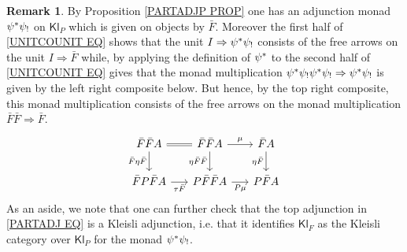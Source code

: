 \documentclass[a4paper,10pt
,draft
]{article}%
\numberwithin{equation}{section}
\numberwithin{figure}{section}
\theoremstyle{definition} %
\newtheorem{remark}[equation]{Remark}%
\newcommand{\Kl}{\mathsf{Kl}}
\newcommand{\1}{\ensuremath{\mathbbm 1}}%
\begin{document}
\begin{remark}\label{MONALGP REM}
By Proposition \ref{PARTADJP PROP}
one has an adjunction monad $\psi^{\**} \psi_!$
on $\Kl_P$ which is given on objects by $\bar{F}$.
Moreover the first half of
\eqref{UNITCOUNIT EQ} shows that the unit
$I \Rightarrow \psi^{\**} \psi_!$
consists of the free arrows on the unit $I \Rightarrow \bar{F}$
while, 
by applying the definition of $\psi^{\**}$ to the second half of
\eqref{UNITCOUNIT EQ}
gives that the monad multiplication
$\psi^{\**} \psi_!\psi^{\**} \psi_! \Rightarrow \psi^{\**} \psi_!$
is given by the left right composite below.
But hence, by the top right composite, 
this monad multiplication consists of the free arrows on
the monad multiplication $\bar{F} \bar{F} \Rightarrow \bar{F}$. 
\begin{equation}
\begin{tikzcd}[column sep = 1.55em]
	\bar{F} \bar{F} A \ar{d}[swap]{\bar{F}\eta \bar{F}}
	\ar[equal]{r} 
&
	\bar{F} \bar{F} A 
	\ar{r}{\mu} \ar{d}[swap]{\eta \bar{F} \bar{F}}
&
	\bar{F} A   \ar{d}[swap]{\eta \bar{F}}
\\
	\bar{F} P \bar{F} A \ar{r}[swap]{\tau \bar{F}}
&
	P \bar{F} \bar{F} A \ar{r}[swap]{P\mu}
&
	P \bar{F} A
\end{tikzcd}
\end{equation}
As an aside, we note that one can further check that the top adjunction in \eqref{PARTADJ EQ} is a Kleisli adjunction, i.e.
that it identifies $\Kl_F$ as the Kleisli category over 
$\Kl_P$ for the monad $\psi^{\**} \psi_!$.
\end{remark}
\end{document}

